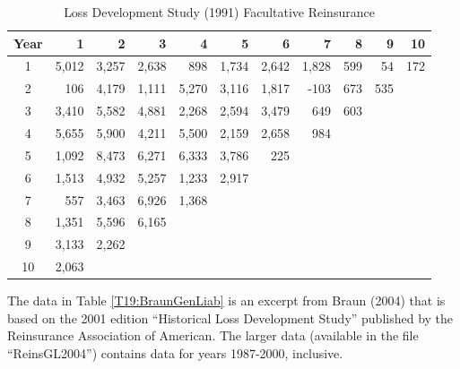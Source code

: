 \begin{exercises}
\begin{table}[h]
 \caption{\label{T19:EnglandVerrall} Loss Development
Study (1991) Facultative Reinsurance}
\begin{tabular}{crrrrrrrrrr}
\hline
      Year &          1 &          2 &          3 &          4 &          5 &          6 &          7 &          8 &          9 &         10 \\
\hline         1 &      5,012 &      3,257 &      2,638 &        898 &      1,734 &      2,642 &      1,828 &        599 &         54 &        172 \\
         2 &        106 &      4,179 &      1,111 &      5,270 &      3,116 &      1,817 &       -103 &        673 &        535 &            \\
         3 &      3,410 &      5,582 &      4,881 &      2,268 &      2,594 &      3,479 &        649 &        603 &            &            \\
         4 &      5,655 &      5,900 &      4,211 &      5,500 &      2,159 &      2,658 &        984 &            &            &            \\
         5 &      1,092 &      8,473 &      6,271 &      6,333 &      3,786 &        225 &            &            &            &            \\
         6 &      1,513 &      4,932 &      5,257 &      1,233 &      2,917 &            &            &            &            &            \\
         7 &        557 &      3,463 &      6,926 &      1,368 &            &            &            &            &            &            \\
         8 &      1,351 &      5,596 &      6,165 &            &            &            &            &            &            &            \\
         9 &      3,133 &      2,262 &            &            &            &            &            &            &            &            \\
        10 &      2,063 &            &            &            &            &            &            &            &            &            \\
\hline
\end{tabular}
\end{table}

\newpage


\item The data in Table \ref{T19:BraunGenLiab} is an excerpt from Braun
(2004) that is based on the 2001 edition ``Historical Loss
Development Study'' published by the Reinsurance Association of
American. The larger data (available in the file ``ReinsGL2004'')
contains data for years 1987-2000, inclusive.


\end{exercises}
